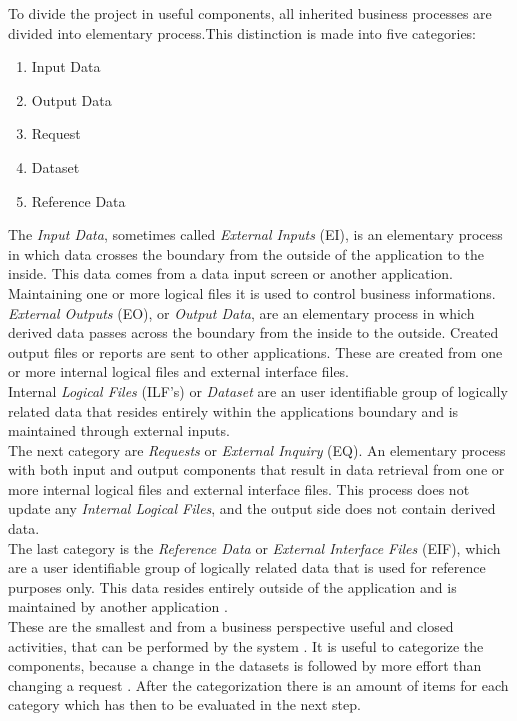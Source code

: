To divide the project in useful components, all inherited business processes are divided into elementary process.This distinction is made into five categories:
\begin{enumerate}
	\item Input Data
	\item Output Data
	\item Request
	\item Dataset
	\item Reference Data
\end{enumerate}
The \textit{Input Data}, sometimes called \textit{External Inputs} (EI), is an elementary process in which data crosses the boundary from the outside of the application to the inside. This data comes from a data input screen or another application. Maintaining one or more logical files it is used to control business informations.\\
\textit{External Outputs} (EO), or \textit{Output Data}, are an elementary process in which derived data passes across the boundary from the inside to the outside. Created output files or reports are sent to other applications. These are created from one or more internal logical files and external interface files.\\
Internal \textit{Logical Files} (ILF’s) or \textit{Dataset} are an user identifiable group of logically related data that resides entirely within the applications boundary and is maintained through external inputs.\\
The next category are \textit{Requests} or \textit{External Inquiry} (EQ). An elementary process with both input and output components that result in data retrieval from one or more internal logical files and external interface files. This process does not update any \textit{Internal Logical Files}, and the output side does not contain derived data.\\
The last category is the \textit{Reference Data} or \textit{External Interface Files} (EIF), which are a user identifiable group of logically related data that is used for reference purposes only. This data resides entirely outside of the application and is maintained by another application \cite{fpafundamentals}.\\
These are the smallest and from a business perspective useful and closed activities, that can be performed by the system \cite{FPKompakt}. It is useful to categorize the components, because a change in the datasets is followed by more effort than changing a request \cite{itplanung}. After the categorization there is an amount of items for each category which has then to be evaluated in the next step.

